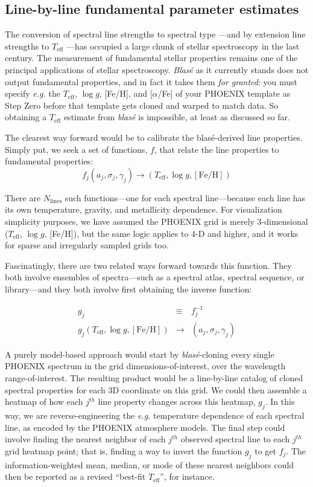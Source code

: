 \documentclass[twocolumn]{aastex631}
\begin{document}
\subsection{Line-by-line fundamental parameter estimates}
The conversion of spectral line strengths to spectral type \citep{1901AnHar..28..129C}---and by extension line strengths to $T_\mathrm{eff}$ \citep{1925PhDT.........1P}---has occupied a large chunk of stellar spectroscopy in the last century.  The measurement of fundamental stellar properties remains one of the principal applications of stellar spectroscopy.   \emph{Blas\'e} as it currently stands does not output fundamental properties, and in fact it takes them \emph{for granted}: you must specify \emph{e.g.} the $T_\mathrm{eff}$, $\log{g}$, [Fe/H], and [$\alpha$/Fe] of your PHOENIX template as Step Zero before that template gets cloned and warped to match data.  So obtaining a $T_\mathrm{eff}$ estimate from  \emph{blas\'e} is impossible, at least as discussed so far.

The clearest way forward would be to calibrate the blas\'e-derived line properties.  Simply put, we seek a set of functions, $f$, that relate the line properties to fundamental properties:
$$f_j(a_j, \sigma_j, \gamma_j) \to (T_\mathrm{eff}, \log{g}, [\mathrm{Fe}/\mathrm{H}])$$

There are $N_{\mathrm{lines}}$ such functions---one for each spectral line---because each line has its own temperature, gravity, and metallicity dependence.  For visualization simplicity purposes, we have assumed the PHOENIX grid is merely 3-dimensional ($T_\mathrm{eff}$, $\log{g}$, [Fe/H]), but the same logic applies to 4-D and higher, and it works for sparse and irregularly sampled grids too.

Fascinatingly, there are two related ways forward towards this function.  They both involve ensembles of spectra---such as a spectral atlas, spectral sequence, or library---and they both involve first obtaining the inverse function:

\begin{eqnarray}
    g_j &\equiv& f^{-1}_j\\
    g_j(T_\mathrm{eff}, \log{g}, [\mathrm{Fe}/\mathrm{H}]) &\to& (a_j, \sigma_j, \gamma_j)
\end{eqnarray}

A purely model-based approach would start by  \emph{blas\'e}-cloning every single PHOENIX spectrum in the grid dimensions-of-interest, over the wavelength range-of-interest.  The resulting product would be a line-by-line catalog of cloned spectral properties for each 3D coordinate on this grid.  We could then assemble a heatmap of how each $j^{th}$ line property changes across this heatmap, $g_j$.  In this way, we are reverse-engineering the \emph{e.g.} temperature dependence of each spectral line, as encoded by the PHOENIX atmosphere models.  The final step could involve finding the nearest neighbor of each $j^{th}$ observed spectral line to each $j^{th}$ grid heatmap point; that is, finding a way to invert the function $g_j$ to get $f_j$.  The information-weighted mean, median, or mode of these nearest neighbors could then be reported as a revised ``best-fit $T_\mathrm{eff}$'', for instance.
\end{document}

